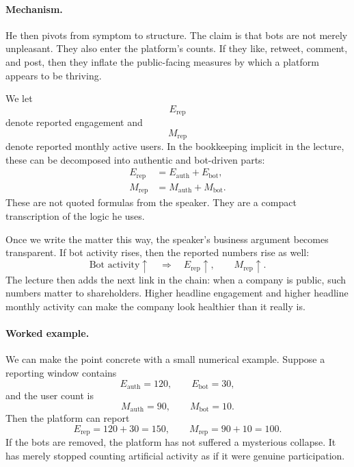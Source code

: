 \paragraph{Mechanism.}
He then pivots from symptom to structure. The claim is that bots are not merely unpleasant. They also enter the platform's counts. If they like, retweet, comment, and post, then they inflate the public-facing measures by which a platform appears to be thriving.

\begin{definition}
We let
\[
E_{\mathrm{rep}}
\]
denote reported engagement and
\[
M_{\mathrm{rep}}
\]
denote reported monthly active users. In the bookkeeping implicit in the lecture, these can be decomposed into authentic and bot-driven parts:
\begin{align}
E_{\mathrm{rep}} &= E_{\mathrm{auth}} + E_{\mathrm{bot}}, \\
M_{\mathrm{rep}} &= M_{\mathrm{auth}} + M_{\mathrm{bot}}.
\end{align}
These are not quoted formulas from the speaker. They are a compact transcription of the logic he uses.
\end{definition}

Once we write the matter this way, the speaker's business argument becomes transparent. If bot activity rises, then the reported numbers rise as well:
\begin{equation}
\text{Bot activity} \uparrow
\quad \Longrightarrow \quad
E_{\mathrm{rep}} \uparrow,\qquad
M_{\mathrm{rep}} \uparrow.
\end{equation}
The lecture then adds the next link in the chain: when a company is public, such numbers matter to shareholders. Higher headline engagement and higher headline monthly activity can make the company look healthier than it really is.

\paragraph{Worked example.}
We can make the point concrete with a small numerical example. Suppose a reporting window contains
\[
E_{\mathrm{auth}} = 120,\qquad E_{\mathrm{bot}} = 30,
\]
and the user count is
\[
M_{\mathrm{auth}} = 90,\qquad M_{\mathrm{bot}} = 10.
\]
Then the platform can report
\begin{equation}
E_{\mathrm{rep}} = 120 + 30 = 150,
\qquad
M_{\mathrm{rep}} = 90 + 10 = 100.
\end{equation}
If the bots are removed, the platform has not suffered a mysterious collapse. It has merely stopped counting artificial activity as if it were genuine participation.

